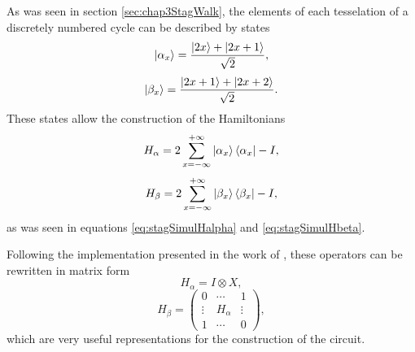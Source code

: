 \documentclass[../../dissertation.tex]{subfiles}
\begin{document}
As was seen in section \ref{sec:chap3StagWalk}, the elements of each
tesselation of a discretely numbered cycle can be described by states
\begin{equation}
        \ket{\alpha_x} = \frac{\ket{2x} + \ket{2x+1}}{\sqrt{2}},
\end{equation}
\begin{equation}
        \ket{\beta_x} = \frac{\ket{2x+1}+\ket{2x+2}}{\sqrt{2}}.
\end{equation}
These states allow the construction of the Hamiltonians
\begin{equation}
        H_\alpha = 2\sum_{x=-\infty}^{+\infty}\ket{\alpha_{x}}\bra{\alpha_x} - I,
\end{equation}
\begin{equation}
        H_\beta = 2\sum_{x=-\infty}^{+\infty}\ket{\beta_{x}}\bra{\beta_x} - I,
\end{equation}
as was seen in equations \ref{eq:stagSimulHalpha} and \ref{eq:stagSimulHbeta}.\par

Following the implementation presented in the work of \cite{acasiete2020},
these operators can be rewritten in matrix form 
\begin{equation}
	H_\alpha = I \otimes X,
\end{equation}
\begin{equation} 
	H_\beta = 
	\begin{pmatrix}
	0 & \cdots & 1\\
	\vdots & H_\alpha & \vdots\\
	1 & \cdots & 0
	\end{pmatrix},
\end{equation} 
which are very useful representations for the construction of the circuit.\par
\end{document}

